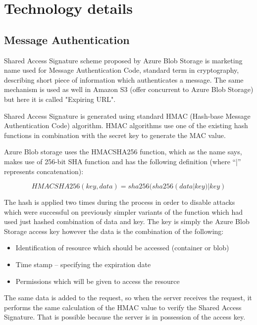 \chapter{Technology details}
\section{Message Authentication}
\label{tech:azure_blob_storage}
Shared Access Signature scheme proposed by Azure Blob Storage is marketing name used for Message Authentication Code, standard term in cryptography, describing short piece of information which authenticates a message. The same mechanism is used as well in Amazon S3 (offer concurrent to Azure Blob Storage) but here it is called "Expiring URL".

Shared Access Signature is generated using standard HMAC (Hash-base Message Authentication Code) algorithm. HMAC algorithms use one of the existing hash functions in combination with the secret key to generate the MAC value.

Azure Blob storage uses the HMACSHA256 function, which as the name says, makes use of 256-bit SHA function and has the following definition (where “|” represents concatenation):

\begin{equation}
HMACSHA256 (key, data) = sha256(sha256(data|key)|key)
\end{equation}

The hash is applied two times during the process in order to disable attacks which were successful on previously simpler variants of the function which had used just hashed combination of data and key\cite{wiki:hmac}. The key is simply the Azure Blob Storage access key however the data is the combination of the following:

\begin{itemize}
	\item Identification of resource which should be accessed (container or blob)
	\item Time stamp – specifying the expiration date
	\item Permissions which will be given to access the resource
\end{itemize}

The same data is added to the request, so when the server receives the request, it performs the same calculation of the HMAC value to verify the Shared Access Signature. That is possible because the server is in possession of the access key.

